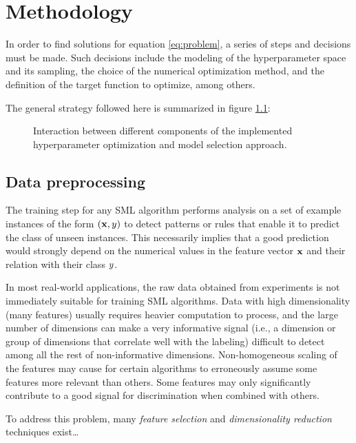 \chapter{Methodology}
	In order to find solutions for equation \ref{eq:problem}, a series of steps and decisions must
	be made. Such decisions include the modeling of the hyperparameter space and its sampling, the
	choice of the numerical optimization method, and the definition of the target function to
	optimize, among others.

	The general strategy followed here is summarized in figure \ref{fig:generalapproach}:

	\begin{figure}[here]
		\begin{center}
		\end{center}
		\caption[General methodology diagram]{Interaction between different components of the
		implemented hyperparameter optimization and model selection approach.}
		\label{fig:generalapproach}
	\end{figure}


\section{Data preprocessing}
	The training step for any SML algorithm performs analysis on a set of example instances of the
	form $(\mathbf{x}, y)$ to detect patterns or rules that enable it to predict the class of
	unseen instances. This necessarily implies that a good prediction would strongly depend on the
	numerical values in the feature vector $\mathbf{x}$ and their relation with their class $y$.

	In most real-world applications, the raw data obtained from experiments is not immediately suitable for
	training SML algorithms. Data with high dimensionality (many features) usually requires heavier computation to
	process, and the large number of dimensions can make a very informative signal (i.e., a
	dimension or group of dimensions that correlate well with the labeling) difficult to detect among
	all the rest of non-informative dimensions. Non-homogeneous scaling of the features may cause
	for certain algorithms to erroneously assume some features more relevant than others. Some
	features may only significantly contribute to a good signal for discrimination when combined
	with others.

	To address this problem, many \emph{feature selection} and \emph{dimensionality reduction}
	techniques  exist\ldots


